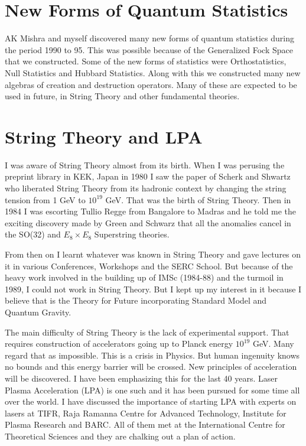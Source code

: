 \vspace{-\topsep}     
\section*{New Forms of Quantum Statistics}

AK Mishra and myself discovered many new forms of quantum statistics during
the period 1990 to 95. This was possible because of the Generalized Fock Space
that we constructed. Some of the new forms of statistics were Orthostatistics, 
Null Statistics and Hubbard Statistics. Along with this we constructed many
new algebras of creation and destruction operators. Many of these are expected
to be used in future, in String Theory and other fundamental theories.

\vspace{-\topsep}
\section*{String Theory and LPA}

I was aware of String Theory almost from its birth. When I was perusing 
the preprint library in KEK, Japan in 1980 I saw the paper of Scherk and 
Shwartz who liberated String Theory from its hadronic context by 
changing the string tension from 1 GeV to $10^{19}$ GeV. That was the birth 
of String Theory. Then in 1984 I was escorting Tullio Regge from 
Bangalore to Madras and he told me the exciting discovery made by Green 
and Schwarz that all the anomalies cancel in the SO(32) and $E_8 \times E_8$ 
Superstring theories.

From then on I learnt whatever was known in String Theory and gave 
lectures on it in various Conferences, Workshops and the SERC School. 
But because of the heavy work involved in the building up of IMSc 
(1984-88) and the turmoil in 1989, I could not work in String Theory. 
But I kept up my interest in it because I believe that is the Theory for 
Future incorporating Standard Model and Quantum Gravity.

The main difficulty of String Theory is the lack of experimental 
support. That requires construction of accelerators going up to Planck 
energy $10^{19}$ GeV. Many regard that as impo\-ssible. This is a crisis in 
Physics. But human ingenuity knows no bounds and this energy barrier 
will be crossed. New principles of acceleration will be discovered. I 
have been emphasizing this for the last 40 years. Laser Plasma 
Acceleration (LPA) is one such and it has been pursued for some time all 
over the world. I have discussed the importance of starting LPA with 
experts on lasers at TIFR, Raja Ramanna Centre for Advanced Technology, 
Institute for Plasma Research and BARC. All of them met at the 
International Centre for Theoretical Sciences and they are chalking out 
a plan of action.

